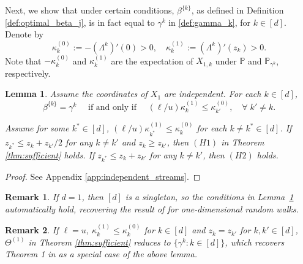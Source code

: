 \documentclass[aap,preprint]{imsart}
\newcommand{\Pro}{{\mathbb{P}}}
\theoremstyle{plain}
\newtheorem{lemma}[theorem]{Lemma}
\newtheorem{remark}{Remark}[section]
\theoremstyle{definition}
\begin{document}

Next, we show that under certain conditions,
$\beta^{\{k\}}$, as defined in Definition \ref{def:optimal_beta_j}, is in fact equal to $\gamma^{k}$ in \eqref{def:gamma_k}, for $k \in [d]$. 
Denote by
$$
\kappa_k^{(0)}  :=  -(\Lambda^k)'(0) > 0, \quad \kappa_k^{(1)}  :=   (\Lambda^k)'(z_k) > 0.
$$
Note that $-\kappa_k^{(0)}$ and $\kappa_k^{(1)}$ are  the expectation of $X_{1,k}$ under $\Pro$ and $\Pro_{\gamma^k}$, respectively.

\begin{lemma}\label{lemma:independent_one_change}
Assume the coordinates of $X_1$ are independent. 
For each $k \in [d]$, 
$$\beta^{\{k\}} = \gamma^{k} \quad \text{ if and only if } \quad (\ell/u) \kappa_k^{(1)}  \leq \kappa_{k'}^{(0)}, \quad \forall\;  k' \neq k.$$

Assume for some $k^* \in [d]$, $(\ell/u) \kappa_{k^*}^{(1)} \leq \kappa_{k}^{(0)}$ for each $k \neq k^* \in [d]$. If $z_{k^*} \leq z_{k} + z_{k'}/2$ for any  $k \neq k'$ and $z_{k} \geq z_{k'}$, then 
 $(H1)$ in Theorem \ref{thm:sufficient}  holds. If  $z_{k^*} \leq z_{k} + z_{k'}$ for any  $k \neq k'$,  then  $(H2)$ holds.
\end{lemma}
\begin{proof}
See Appendix \ref{app:independent_streams}.
\end{proof}

\begin{remark}
If $d = 1$, then $[d]$ is a singleton, so the conditions in Lemma~\ref{lemma:independent_one_change} automatically hold, recovering the result of \cite{siegmund1976importance} for one-dimensional random walks.
\end{remark}


\begin{remark}\label{remark:song_intersection}
If $\ell = u$, $\kappa_{k}^{(1)} \leq \kappa_{k}^{(0)}$ for $k \in [d]$ and $z_{k} = z_{k'}$ for $k, k' \in [d]$,  $\Theta^{(1)}$ in Theorem  \ref{thm:sufficient} reduces to $\{\gamma^{k}: k \in [d]\}$, which recovers Theorem 1 in \cite{song2016logarithmically} as a special case of the above lemma.
\end{remark}
\end{document}
